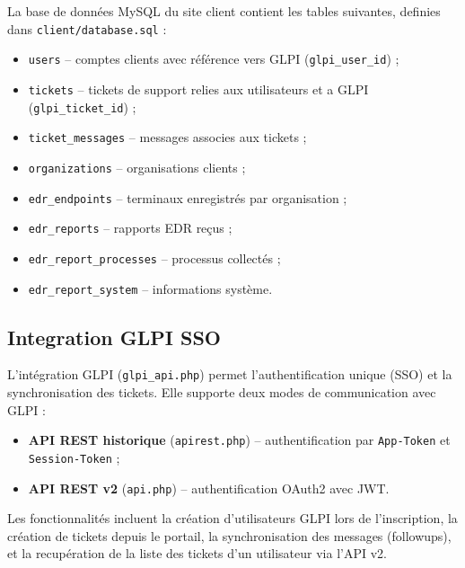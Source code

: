 La base de données MySQL du site client contient les tables suivantes,
definies dans \texttt{client/database.sql} :

\begin{itemize}
  \item \texttt{users} -- comptes clients avec référence vers GLPI
    (\texttt{glpi\_user\_id}) ;
  \item \texttt{tickets} -- tickets de support relies aux utilisateurs
    et a GLPI (\texttt{glpi\_ticket\_id}) ;
  \item \texttt{ticket\_messages} -- messages associes aux tickets ;
  \item \texttt{organizations} -- organisations clients ;
  \item \texttt{edr\_endpoints} -- terminaux enregistrés par organisation ;
  \item \texttt{edr\_reports} -- rapports EDR reçus ;
  \item \texttt{edr\_report\_processes} -- processus collectés ;
  \item \texttt{edr\_report\_system} -- informations système.
\end{itemize}

\subsection{Integration GLPI SSO}

L'intégration GLPI (\texttt{glpi\_api.php}) permet l'authentification
unique (SSO) et la synchronisation des tickets. Elle supporte deux modes
de communication avec GLPI :

\begin{itemize}
  \item \textbf{API REST historique} (\texttt{apirest.php}) --
    authentification par \texttt{App-Token} et \texttt{Session-Token} ;
  \item \textbf{API REST v2} (\texttt{api.php}) -- authentification
    OAuth2 avec JWT.
\end{itemize}

Les fonctionnalités incluent la création d'utilisateurs GLPI lors de
l'inscription, la création de tickets depuis le portail, la
synchronisation des messages (followups), et la recupération de la liste
des tickets d'un utilisateur via l'API v2.

